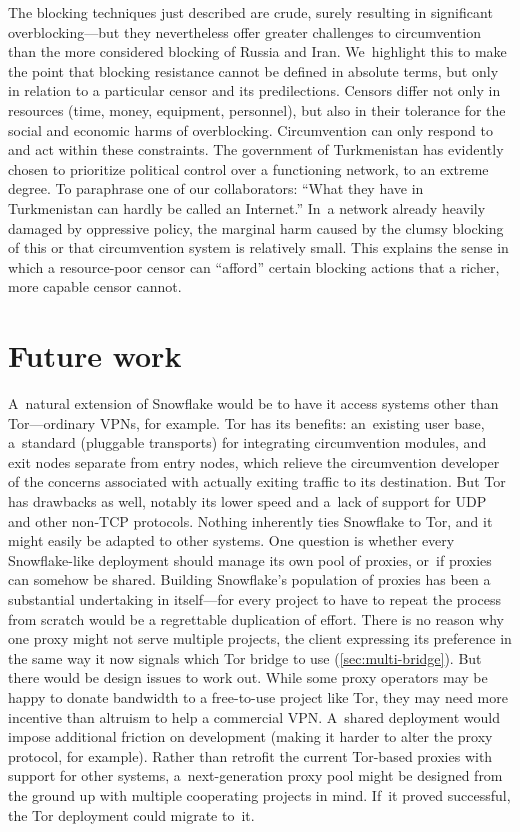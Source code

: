 \documentclass[letterpaper,twocolumn]{article}
\begin{document}
The blocking techniques just described are crude,
surely resulting in significant overblocking---but
they nevertheless offer greater challenges to circumvention
than the more considered blocking of Russia and Iran.
We~highlight this to make the point that blocking resistance
cannot be defined in absolute terms,
but only in relation to a particular censor
and its predilections.
Censors differ not only in resources
(time, money, equipment, personnel),
but also in their tolerance
for the social and economic harms of overblocking.
Circumvention can only respond to and act within these constraints.
The government of Turkmenistan has evidently chosen
to prioritize political control
over a functioning network, to an extreme degree.
To paraphrase one of our collaborators:
``What they have in Turkmenistan can hardly be called an Internet.''
In~a network already heavily damaged by oppressive policy,
the marginal harm caused by the clumsy blocking of
this or that circumvention system is relatively small.
This explains the sense in which a resource-poor censor
can ``afford'' certain blocking actions
that a richer, more capable censor cannot.

\section{Future work}
\label{sec:future}

A~natural extension of Snowflake would be
to have it access systems other than Tor---ordinary
VPNs, for example.
Tor has its benefits:
an~existing user base,
a~standard (pluggable transports) for integrating
circumvention modules,
and exit nodes separate from entry nodes,
which relieve the circumvention developer of the concerns associated
with actually exiting traffic to its destination.
But Tor has drawbacks as well,
notably its lower speed and
a~lack of support for UDP and other non-TCP protocols.
Nothing inherently ties Snowflake to Tor,
and it might easily be adapted to other systems.
One question is whether every Snowflake-like deployment
should manage its own pool of proxies,
or~if proxies can somehow be shared.
Building Snowflake's population of proxies
has been a substantial undertaking in itself---for
every project to have to repeat the process from scratch
would be a regrettable duplication of effort.
There is no reason why one proxy might not
serve multiple projects,
the client expressing its preference
in the same way it now signals which Tor bridge to use (\autoref{sec:multi-bridge}).
But there would be design issues to work out.
While some proxy operators may be happy to donate
bandwidth to a free-to-use project like Tor,
they may need more incentive than altruism to help a commercial VPN.
A~shared deployment would impose additional friction on development
(making it harder to alter the proxy protocol, for example).
Rather than retrofit the current Tor-based proxies
with support for other systems,
a~next-generation proxy pool might be designed
from the ground up with multiple cooperating projects in mind.
If~it proved successful,
the Tor deployment could migrate to~it.
\end{document}
